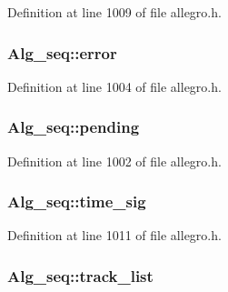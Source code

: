Definition at line 1009 of file allegro.\+h.

\subsubsection[{\texorpdfstring{error}{error}}]{ Alg\+\_\+seq\+::error\hspace{0.3cm}{\ttfamily [protected]}}\hypertarget{class_alg__seq_a4f93e99fab0622901ce5281203c3dea8}{}\label{class_alg__seq_a4f93e99fab0622901ce5281203c3dea8}


Definition at line 1004 of file allegro.\+h.

\subsubsection[{\texorpdfstring{pending}{pending}}]{ Alg\+\_\+seq\+::pending\hspace{0.3cm}{\ttfamily [protected]}}\hypertarget{class_alg__seq_a3132340d161c2e720e74cc5048664d3c}{}\label{class_alg__seq_a3132340d161c2e720e74cc5048664d3c}


Definition at line 1002 of file allegro.\+h.

\subsubsection[{\texorpdfstring{time\+\_\+sig}{time_sig}}]{ Alg\+\_\+seq\+::time\+\_\+sig}\hypertarget{class_alg__seq_a6edff43d6932fc8b2cf53553fd97f565}{}\label{class_alg__seq_a6edff43d6932fc8b2cf53553fd97f565}


Definition at line 1011 of file allegro.\+h.

\subsubsection[{\texorpdfstring{track\+\_\+list}{track_list}}]{ Alg\+\_\+seq\+::track\+\_\+list}\hypertarget{class_alg__seq_a5e3339e77f1ef07f5af0fbfc0ba97bc9}{}\label{class_alg__seq_a5e3339e77f1ef07f5af0fbfc0ba97bc9}


